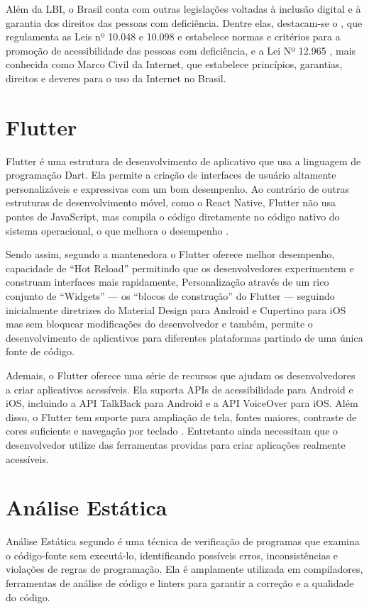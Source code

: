 Além da LBI, o Brasil conta com outras legislações voltadas à inclusão digital e à garantia dos direitos das pessoas com deficiência. Dentre elas, destacam-se o \cite{decreto5296}, que regulamenta as Leis nº 10.048 e 10.098 e estabelece normas e critérios para a promoção de acessibilidade das pessoas com deficiência, e a Lei Nº 12.965 \cite{lei12965}, mais conhecida como Marco Civil da Internet, que estabelece princípios, garantias, direitos e deveres para o uso da Internet no Brasil.

\section{Flutter}

Flutter é uma estrutura de desenvolvimento de aplicativo que usa a linguagem de programação Dart. Ela permite a criação de interfaces de usuário altamente personalizáveis e expressivas com um bom desempenho. Ao contrário de outras estruturas de desenvolvimento móvel, como o React Native, Flutter não usa pontes de JavaScript, mas compila o código diretamente no código nativo do sistema operacional, o que melhora o desempenho \cite{flutter}.

Sendo assim, segundo a mantenedora o Flutter oferece melhor desempenho, capacidade de “Hot Reload” permitindo que os desenvolvedores experimentem e construam interfaces mais rapidamente, Personalização através de um rico conjunto de “Widgets” --- os “blocos de construção” do Flutter --- seguindo inicialmente diretrizes do Material Design para Android e Cupertino para iOS mas sem bloquear modificações do desenvolvedor e também, permite o desenvolvimento de aplicativos para diferentes plataformas partindo de uma única fonte de código.

Ademais, o Flutter oferece uma série de recursos que ajudam os desenvolvedores a criar aplicativos acessíveis. Ela suporta APIs de acessibilidade para Android e iOS, incluindo a API TalkBack para Android e a API VoiceOver para iOS. Além disso, o Flutter tem suporte para ampliação de tela, fontes maiores, contraste de cores suficiente e navegação por teclado \cite{flutter}. Entretanto ainda necessitam que o desenvolvedor utilize das ferramentas providas para criar aplicações realmente acessíveis.

\section{Análise Estática}

Análise Estática segundo \cite{craftinginterpreters} é uma técnica de verificação de programas que examina o código-fonte sem executá-lo, identificando possíveis erros, inconsistências e violações de regras de programação. Ela é amplamente utilizada em compiladores, ferramentas de análise de código e linters para garantir a correção e a qualidade do código.

